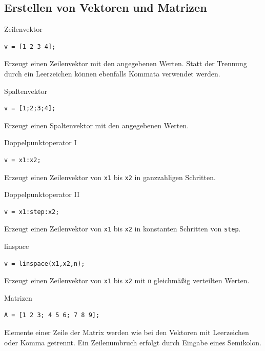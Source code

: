 \documentclass[12pt, a4paper, twoside]{article}
\begin{document}
        \subsection{Erstellen von Vektoren und Matrizen}
        \begin{CodeErklaerungBox}{Zeilenvektor}
                \begin{lstlisting}
v = [1 2 3 4];
                \end{lstlisting}
                \tcblower
                Erzeugt einen Zeilenvektor mit den angegebenen Werten. Statt der Trennung durch ein Leerzeichen können ebenfalls Kommata verwendet werden.
                \end{CodeErklaerungBox}
                \begin{CodeErklaerungBox}{Spaltenvektor}
                \begin{lstlisting}
v = [1;2;3;4];
                \end{lstlisting}
                \tcblower
                Erzeugt einen Spaltenvektor mit den angegebenen Werten.
            \end{CodeErklaerungBox}
            \begin{CodeErklaerungBox}{Doppelpunktoperator I}
                \begin{lstlisting}
v = x1:x2;
                \end{lstlisting}
                \tcblower
                Erzeugt einen Zeilenvektor von \texttt{x1} bis \texttt{x2} in ganzzahligen Schritten.
            \end{CodeErklaerungBox}
            \begin{CodeErklaerungBox}{Doppelpunktoperator II}
                \begin{lstlisting}
v = x1:step:x2;
                \end{lstlisting}
                \tcblower
                Erzeugt einen Zeilenvektor von \texttt{x1} bis \texttt{x2} in konstanten Schritten von \texttt{step}.
            \end{CodeErklaerungBox}
            \begin{CodeErklaerungBox}{linspace}
                \begin{lstlisting}
v = linspace(x1,x2,n);
                \end{lstlisting}
                \tcblower
                Erzeugt einen Zeilenvektor von \texttt{x1} bis \texttt{x2} mit \texttt{n} gleichmäßig verteilten Werten.
            \end{CodeErklaerungBox}
            \begin{CodeErklaerungBox}{Matrizen}
                \begin{lstlisting}
A = [1 2 3; 4 5 6; 7 8 9];
                \end{lstlisting}
                \tcblower
                Elemente einer Zeile der Matrix werden wie bei den Vektoren mit Leerzeichen oder Komma getrennt. Ein Zeilenumbruch erfolgt durch Eingabe eines Semikolon.
            \end{CodeErklaerungBox}
\end{document}
